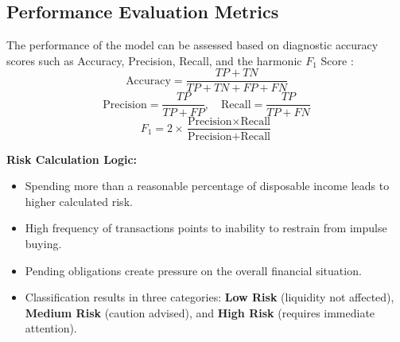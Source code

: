 \documentclass[conference]{IEEEtran}
\begin{document}
\subsection{Performance Evaluation Metrics}

The performance of the model can be assessed based on diagnostic accuracy scores such as Accuracy, Precision, Recall, and the harmonic $F_1$ Score \cite{fawcett2006}:
\begin{equation}
\text{Accuracy} = \frac{TP + TN}{TP + TN + FP + FN}
\end{equation}
\begin{equation}
\text{Precision} = \frac{TP}{TP + FP}, \quad \text{Recall} = \frac{TP}{TP + FN}
\end{equation}
\begin{equation}
F_1 = 2 \times \frac{\text{Precision} \times \text{Recall}}{\text{Precision} + \text{Recall}}
\end{equation}

\noindent\textbf{Risk Calculation Logic:}
\begin{itemize}
    \item Spending more than a reasonable percentage of disposable income leads to higher calculated risk.
    \item High frequency of transactions points to inability to restrain from impulse buying.
    \item Pending obligations create pressure on the overall financial situation.
    \item Classification results in three categories: \textbf{Low Risk} (liquidity not affected), \textbf{Medium Risk} (caution advised), and \textbf{High Risk} (requires immediate attention).
\end{itemize}
\end{document}
